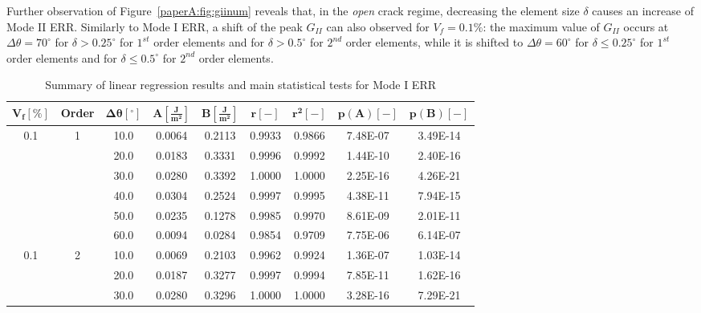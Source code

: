 Further observation of Figure~\ref{paperA:fig:giinum} reveals that, in the \emph{open} crack regime, decreasing the element size $\delta$ causes an increase of Mode II ERR. Similarly to Mode I ERR, a shift of the peak $G_{II}$ can also observed for $V_{f}=0.1\%$: the maximum value of $G_{II}$ occurs at $\Delta\theta=70^{\circ}$ for $\delta>0.25^{\circ}$ for $1^{st}$ order elements and for $\delta>0.5^{\circ}$ for $2^{nd}$ order elements, while it is shifted to $\Delta\theta=60^{\circ}$ for $\delta\leq0.25^{\circ}$ for $1^{st}$ order elements and for $\delta\leq0.5^{\circ}$ for $2^{nd}$ order elements.

\begin{table}[!h]
 \centering
 \caption{Summary of linear regression results and main statistical tests for Mode I ERR}\label{paperA:tab:GIinterp}
 \begin{tabular}{ccccccccc}
\small$\mathbf{V_{f} \left[\%\right]}$&\small\bf{Order}&\small$\mathbf{\Delta\theta \left[^{\circ}\right]}$&\small$\mathbf{A\left[\frac{J}{m^{2}}\right]}$ &\small$\mathbf{B\left[\frac{J}{m^{2}}\right]}$ &\small $\mathbf{r\left[-\right]}$ &\small $\mathbf{r^{2}\left[-\right]}$ &\small $\mathbf{p(A)\left[-\right]}$ &\small $\mathbf{p(B)\left[-\right]}$\\
\toprule
\midrule
\small0.1&\small1&	\small10.0&	\small0.0064&	\small0.2113&	\small0.9933&	\small0.9866&	\small7.48E-07&	\small3.49E-14\\
&&		\small20.0& \small0.0183&\small	0.3331&\small	0.9996&\small	0.9992&\small	1.44E-10&\small	2.40E-16\\
&&		\small30.0&	\small0.0280&\small	0.3392&\small	1.0000&\small	1.0000&\small	2.25E-16&\small	4.26E-21\\
&&		\small40.0&	\small0.0304&\small	0.2524&\small	0.9997&\small	0.9995&\small	4.38E-11&\small	7.94E-15\\
&&		\small50.0&	\small0.0235&\small	0.1278&\small	0.9985&\small	0.9970&\small	8.61E-09&\small	2.01E-11\\
&&		\small60.0&	\small0.0094&\small	0.0284&\small	0.9854&\small	0.9709&\small	7.75E-06&\small	6.14E-07\\
\midrule
\small0.1&\small2&	\small10.0&	\small0.0069&	\small0.2103&	\small0.9962&	\small0.9924&	\small1.36E-07&	\small1.03E-14\\
&&		\small20.0&	\small0.0187&\small	0.3277&\small	0.9997&\small	0.9994&\small	7.85E-11&\small	1.62E-16\\
&&		\small30.0&	\small0.0280&\small	0.3296&\small	1.0000&\small	1.0000&\small	3.28E-16&\small	7.29E-21\\

\end{tabular}
\end{table}
